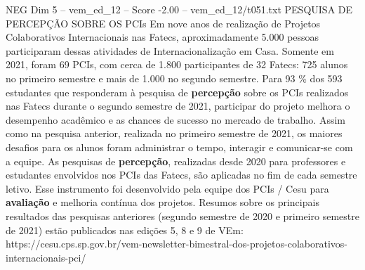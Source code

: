 \begin{textsample}{NEG Dim 5 – vem\_ed\_12 – Score -2.00 – vem\_ed\_12/t051.txt}  \label{ex:f5_neg_006}
PESQUISA DE PERCEPÇÃO SOBRE OS PCIs Em nove anos de realização de Projetos Colaborativos Internacionais nas Fatecs, aproximadamente 5.000 pessoas participaram dessas atividades de Internacionalização em Casa.
Somente em 2021, foram 69 PCIs, com cerca de 1.800 participantes de 32 Fatecs: 725 alunos no primeiro semestre e mais de 1.000 no segundo semestre.
Para 93 \% dos 593 estudantes que responderam à pesquisa de \textbf{percepção} sobre os PCIs realizados nas Fatecs durante o segundo semestre de 2021, participar do projeto melhora o desempenho acadêmico e as chances de sucesso no mercado de trabalho.
Assim como na pesquisa anterior, realizada no primeiro semestre de 2021, os maiores desafios para os alunos foram administrar o tempo, interagir e comunicar-se com a equipe.
As pesquisas de \textbf{percepção}, realizadas desde 2020 para professores e estudantes envolvidos nos PCIs das Fatecs, são aplicadas no fim de cada semestre letivo.
Esse instrumento foi desenvolvido pela equipe dos PCIs / Cesu para \textbf{avaliação} e melhoria contínua dos projetos.
Resumos sobre os principais resultados das pesquisas anteriores (segundo semestre de 2020 e primeiro semestre de 2021) estão publicados nas edições 5, 8 e 9 de VEm: https://cesu.cps.sp.gov.br/vem-newsletter-bimestral-dos-projetos-colaborativos-internacionais-pci/

\end{textsample}

